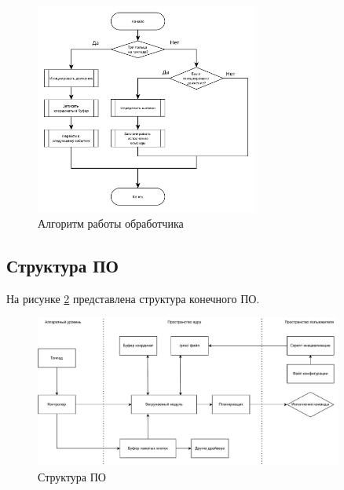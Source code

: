 \begin{figure}[H]
	\centering
	\includegraphics[width=0.65\textwidth]{inc/alg.pdf}
	\caption{Алгоритм работы обработчика}
	\label{fig:alg}
\end{figure}

\subsection{Структура ПО}

На рисунке \ref{fig:arch} представлена структура конечного ПО.

\begin{figure}[H]
	\centering
	\includegraphics[width=0.9\textwidth]{inc/arch.pdf}
	\caption{Структура ПО}
	\label{fig:arch}
\end{figure}

\clearpage
